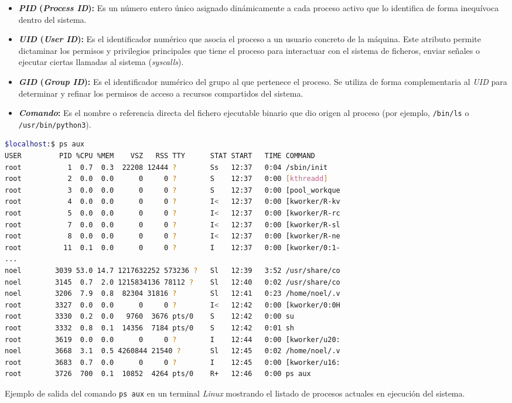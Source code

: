 \begin{itemize}
    \item \textbf{\textit{PID} (\textit{Process ID}):} Es un número entero único asignado dinámicamente a cada proceso activo que lo identifica de forma inequívoca dentro del sistema.
    \item \textbf{\textit{UID} (\textit{User ID}):} Es el identificador numérico que asocia el proceso a un usuario concreto de la máquina. Este atributo permite dictaminar los permisos y privilegios principales que tiene el proceso para interactuar con el sistema de ficheros, enviar señales o ejecutar ciertas llamadas al sistema (\textit{syscalls}).
    \item \textbf{\textit{GID} (\textit{Group ID}):} Es el identificador numérico del grupo al que pertenece el proceso. Se utiliza de forma complementaria al \textit{UID} para determinar y refinar los permisos de acceso a recursos compartidos del sistema.
    \item \textbf{\textit{Comando}:} Es el nombre o referencia directa del fichero ejecutable binario que dio origen al proceso (por ejemplo, \texttt{/bin/ls} o \texttt{/usr/bin/python3}).
\end{itemize}

\begin{code}[h!]
\begin{lstlisting}[language=bash]
$localhost:$ ps aux
USER         PID %CPU %MEM    VSZ   RSS TTY      STAT START   TIME COMMAND
root           1  0.7  0.3  22208 12444 ?        Ss   12:37   0:04 /sbin/init
root           2  0.0  0.0      0     0 ?        S    12:37   0:00 [kthreadd]
root           3  0.0  0.0      0     0 ?        S    12:37   0:00 [pool_workque
root           4  0.0  0.0      0     0 ?        I<   12:37   0:00 [kworker/R-kv
root           5  0.0  0.0      0     0 ?        I<   12:37   0:00 [kworker/R-rc
root           7  0.0  0.0      0     0 ?        I<   12:37   0:00 [kworker/R-sl
root           8  0.0  0.0      0     0 ?        I<   12:37   0:00 [kworker/R-ne
root          11  0.1  0.0      0     0 ?        I    12:37   0:00 [kworker/0:1-
...
noel        3039 53.0 14.7 1217632252 573236 ?   Sl   12:39   3:52 /usr/share/co
noel        3145  0.7  2.0 1215834136 78112 ?    Sl   12:40   0:02 /usr/share/co
noel        3206  7.9  0.8  82304 31816 ?        Sl   12:41   0:23 /home/noel/.v
root        3327  0.0  0.0      0     0 ?        I<   12:42   0:00 [kworker/0:0H
root        3330  0.2  0.0   9760  3676 pts/0    S    12:42   0:00 su
root        3332  0.8  0.1  14356  7184 pts/0    S    12:42   0:01 sh
root        3619  0.0  0.0      0     0 ?        I    12:44   0:00 [kworker/u20:
noel        3668  3.1  0.5 4260844 21540 ?       Sl   12:45   0:02 /home/noel/.v
root        3683  0.7  0.0      0     0 ?        I    12:45   0:00 [kworker/u16:
root        3726  700  0.1  10852  4264 pts/0    R+   12:46   0:00 ps aux
\end{lstlisting}
\caption[Ejemplo de salida del comando \texttt{ps aux} en un terminal Linux.]{Ejemplo de salida del comando \texttt{ps aux} en un terminal \textit{Linux} mostrando el listado de procesos actuales en ejecución del sistema.}
\label{cod:ps_aux}
\end{code}

